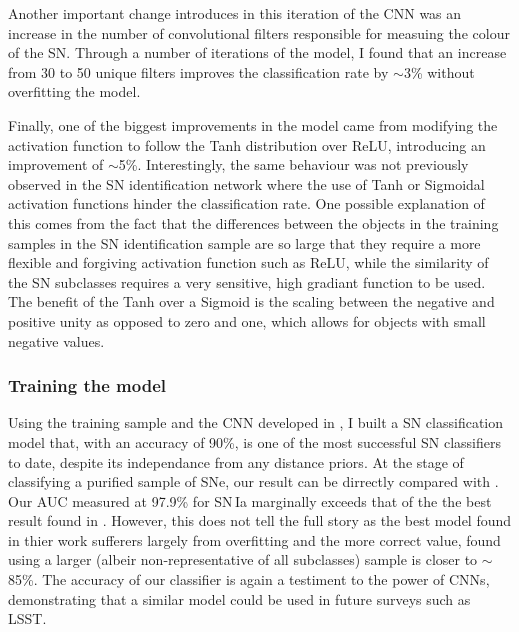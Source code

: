 Another important change introduces in this iteration of the CNN was an increase in the number of convolutional filters responsible for measuing the colour of the SN. Through a number of iterations of the model, I found that an increase from 30 to 50 unique filters improves the classification rate by $\sim$3\% without overfitting the model.

Finally, one of the biggest improvements in the model came from modifying the activation function to follow the Tanh distribution over ReLU, introducing an improvement of $\sim$5\%. Interestingly, the same behaviour was not previously observed in the SN identification network where the use of Tanh or Sigmoidal activation functions hinder the classification rate. One possible explanation of this comes from the fact that the differences between the objects in the training samples in the SN identification sample are so large that they require a more flexible and forgiving activation function such as ReLU, while the similarity of the SN subclasses requires a very sensitive, high gradiant function to be used. The benefit of the Tanh over a Sigmoid is the scaling between the negative and positive unity as opposed to zero and one, which allows for objects with small negative values.

\subsubsection{Training the model} \label{sec:SNClassification}
Using the training sample and the CNN developed in , I built a SN classification model that, with an accuracy of 90\%, is one of the most successful SN classifiers to date, despite its independance from any distance priors. At the stage of classifying a purified sample of SNe, our result can be dirrectly compared with \citet{Lochner2016}. Our AUC measured at 97.9\% for SN\,Ia marginally exceeds that of the the best result found in \citet{Lochner2016}. However, this does not tell the full story as the best model found in thier work sufferers largely from overfitting and the more correct value, found using a larger (albeir non-representative of all subclasses) sample is closer to $\sim$85\%. The accuracy of our classifier is again a testiment to the power of CNNs, demonstrating that a similar model could be used in future surveys such as LSST.

\begin{figure}
  \caption{}
  \label{sec:SNClassificationROC}
\end{figure}

